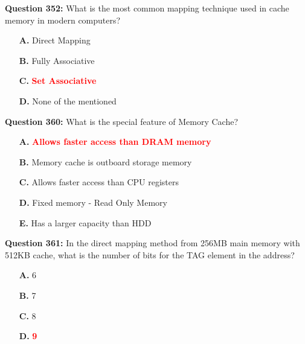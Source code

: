 \documentclass[12pt,a4paper]{article}
\begin{document}
\vspace{0.5cm}

\vspace{0.5cm}

\textbf{Question 352:} What is the most common mapping technique used in cache memory in modern computers?

\begin{itemize}
    \item[\textbf{A.}] Direct Mapping
    \item[\textbf{B.}] Fully Associative
    \item[\textbf{C.}] \textcolor{red}{\textbf{Set Associative}}
    \item[\textbf{D.}] None of the mentioned
\end{itemize}

\vspace{0.5cm}

\vspace{0.5cm}

\textbf{Question 360:} What is the special feature of Memory Cache?

\begin{itemize}
    \item[\textbf{A.}] \textcolor{red}{\textbf{Allows faster access than DRAM memory}}
    \item[\textbf{B.}] Memory cache is outboard storage memory
    \item[\textbf{C.}] Allows faster access than CPU registers
    \item[\textbf{D.}] Fixed memory - Read Only Memory
    \item[\textbf{E.}] Has a larger capacity than HDD
\end{itemize}

\vspace{0.5cm}

\vspace{0.5cm}

\textbf{Question 361:} In the direct mapping method from 256MB main memory with 512KB cache, what is the number of bits for the TAG element in the address?

\begin{itemize}
    \item[\textbf{A.}] 6
    \item[\textbf{B.}] 7
    \item[\textbf{C.}] 8
    \item[\textbf{D.}] \textcolor{red}{\textbf{9}}
\end{itemize}
\end{document}
